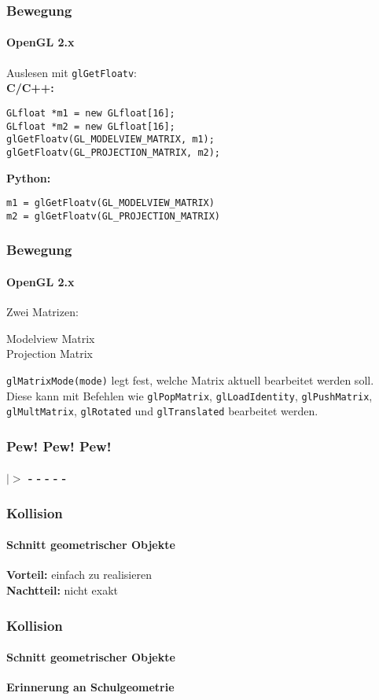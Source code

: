\documentclass[dvips,12pt,xcolor=table]{beamer}
\begin{document}
\begin{frame}[fragile]
\frametitle{Bewegung}
\framesubtitle{OpenGL 2.x}
Auslesen mit \texttt{glGetFloatv}:\\
\vspace{0.3cm}
\textbf{C/C++:}
\begin{verbatim}
GLfloat *m1 = new GLfloat[16];
GLfloat *m2 = new GLfloat[16];
glGetFloatv(GL_MODELVIEW_MATRIX, m1);
glGetFloatv(GL_PROJECTION_MATRIX, m2);
\end{verbatim}
\vspace{0.3cm}
\textbf{Python:}
\begin{verbatim}
m1 = glGetFloatv(GL_MODELVIEW_MATRIX)
m2 = glGetFloatv(GL_PROJECTION_MATRIX)
\end{verbatim}
\end{frame}

\begin{frame}
\frametitle{Bewegung}
\framesubtitle{OpenGL 2.x}
Zwei Matrizen:
\begin{description}
 \item[Modelview Matrix]
 \item[Projection Matrix]
\end{description}
\texttt{glMatrixMode(mode)} legt fest,
welche Matrix aktuell bearbeitet werden soll.
Diese kann mit Befehlen wie
\texttt{glPopMatrix},
\texttt{glLoadIdentity},
\texttt{glPushMatrix},
\texttt{glMultMatrix},
\texttt{glRotated} und
\texttt{glTranslated}
bearbeitet werden.
\end{frame}


\begin{frame}
\frametitle{Pew! Pew! Pew!}
\framesubtitle{$|>$  - - - - -}
\end{frame}


\begin{frame}
\frametitle{Kollision}
\framesubtitle{Schnitt geometrischer Objekte}
\begin{center}


\end{center}
\textbf{Vorteil:} einfach zu realisieren \\
\textbf{Nachtteil:} nicht exakt
\end{frame}

\begin{frame}
\frametitle{Kollision}
\framesubtitle{Schnitt geometrischer Objekte}
\textbf{Erinnerung an Schulgeometrie}

\begin{minipage}[5cm][3mm][s]{8cm}
%
%
%
\end{minipage}
\end{frame}
\end{document}
